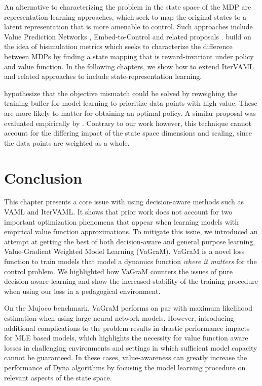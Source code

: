 An alternative to characterizing the problem in the state space of the MDP are representation learning approaches, which seek to map the original states to a latent representation that is more amenable to control. Such approaches include Value Prediction Networks \parencite{oh2017value}, Embed-to-Control \parencite{10.5555/2969442.2969546} and related proposals \parencite{levine2020prediction,cui2021controlaware}. \textcite{zhang2021learning,kemertas2021towards,kemertas2022approximate} build on the idea of bisimulation metrics \parencite{ferns2004metrics,ferns2011bisimulation} which seeks to characterize the difference between MDPs by finding a state mapping that is reward-invariant under policy and value function. 
In the following chapters, we show how to extend IterVAML and related approaches to include state-representation learning.

\textcite{lambert202objective} hypothesize that the objective mismatch could be solved by reweighing the training buffer for model learning to prioritize data points with high value. These are more likely to matter for obtaining an optimal policy. A similar proposal was evaluated empirically by \textcite{nair2020goal}. Contrary to our work however, this technique cannot account for the differing impact of the state space dimensions and scaling, since the data points are weighted as a whole.


\section{Conclusion}
This chapter presents a core issue with using decision-aware methods such as VAML and IterVAML.
It shows that prior work does not account for two important optimization phenomena that appear when learning models with empirical value function approximations.
To mitigate this issue, we introduced an attempt at getting the best of both decision-aware and general purpose learning, Value-Gradient Weighted Model Learning (VaGraM).
VaGraM is a novel loss function to train models that model a dynamics function \emph{where it matters} for the control problem.
We highlighted how VaGraM counters the issues of pure decision-aware learning and show the increased stability of the training procedure when using our loss in a pedagogical environment.

On the Mujoco benchmark, VaGraM performs on par with maximum likelihood estimation when using large neural network models.
However, introducing additional complications to the problem results in drastic performance impacts for MLE based models, which highlights the necessity for value function aware losses in challenging environments and settings in which sufficient model capacity cannot be guaranteed.
In these cases, value-awareness can greatly increase the performance of Dyna algorithms by focusing the model learning procedure on relevant aspects of the state space.

